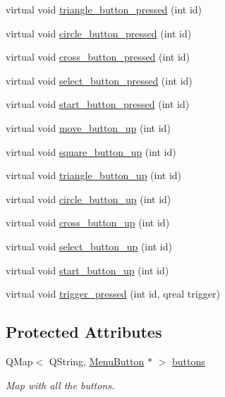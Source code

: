 \begin{DoxyCompactItemize}
virtual void \hyperlink{class_base_menu_a2a96194274f8f38774ce9b4f57322f12}{triangle\-\_\-button\-\_\-pressed} (int id)
\item 
virtual void \hyperlink{class_base_menu_a2eedfd849fb5447cf10584abf4276feb}{circle\-\_\-button\-\_\-pressed} (int id)
\item 
virtual void \hyperlink{class_base_menu_a7e505a84e4ddc33a06b9c3ea7caf04c5}{cross\-\_\-button\-\_\-pressed} (int id)
\item 
virtual void \hyperlink{class_base_menu_a0ad79ba5715550115cc49b7aa195d9b0}{select\-\_\-button\-\_\-pressed} (int id)
\item 
virtual void \hyperlink{class_base_menu_ac5353c43e94cf6bb5de620fe7632b20b}{start\-\_\-button\-\_\-pressed} (int id)
\item 
virtual void \hyperlink{class_base_menu_aa73239e64789bf85c1d510abbae18189}{move\-\_\-button\-\_\-up} (int id)
\item 
virtual void \hyperlink{class_base_menu_a12a4872dc160c013fa3499bf1f6549b8}{square\-\_\-button\-\_\-up} (int id)
\item 
virtual void \hyperlink{class_base_menu_acb41522bb7a004a24df7ea3e115b2c72}{triangle\-\_\-button\-\_\-up} (int id)
\item 
virtual void \hyperlink{class_base_menu_a36ebfe4ba13a911e489961cdfc5950a6}{circle\-\_\-button\-\_\-up} (int id)
\item 
virtual void \hyperlink{class_base_menu_a76fe15e2856203059db24c9c56c1383a}{cross\-\_\-button\-\_\-up} (int id)
\item 
virtual void \hyperlink{class_base_menu_aea510dbeea4fc2859051603acf730d03}{select\-\_\-button\-\_\-up} (int id)
\item 
virtual void \hyperlink{class_base_menu_a8b847f9ed80538c5e96e868ed87ab3c7}{start\-\_\-button\-\_\-up} (int id)
\item 
virtual void \hyperlink{class_base_menu_adb277f30427d5811f86f8699b04c4abe}{trigger\-\_\-pressed} (int id, qreal trigger)
\end{DoxyCompactItemize}
\subsection*{Protected Attributes}
\begin{DoxyCompactItemize}
\item 
\hypertarget{class_base_menu_ab488e57ffca40b039cfebb4d544f1357}{Q\-Map$<$ Q\-String, \hyperlink{class_menu_button}{Menu\-Button} $\ast$ $>$ \hyperlink{class_base_menu_ab488e57ffca40b039cfebb4d544f1357}{buttons}}\label{class_base_menu_ab488e57ffca40b039cfebb4d544f1357}

\begin{DoxyCompactList}\small\item\em Map with all the buttons. \end{DoxyCompactList}\end{DoxyCompactItemize}
